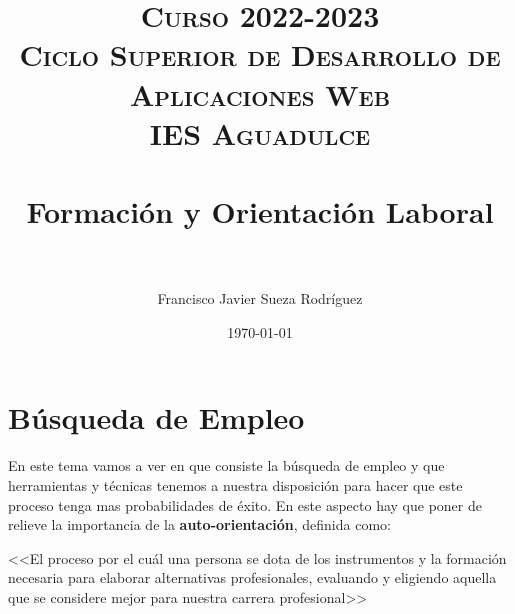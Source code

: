 


\title{
\normalfont \normalsize
\textsc{{\bfseries Curso 2022-2023} \\ Ciclo Superior de Desarrollo de Aplicaciones Web \\ IES Aguadulce} \\ [25pt]
\horrule{0.5pt} \\[0.4cm]
\huge Formación y Orientación Laboral \\
\horrule{0.5pt} \\[0.4cm]
}

\author{Francisco Javier Sueza Rodríguez}
\date{\normalsize\today}


\makeglossaries
{}



\maketitle

\newpage

\tableofcontents

\listoffigures


\newpage

\chapter{Búsqueda de Empleo}
En este tema vamos a ver en que consiste la búsqueda de empleo y que herramientas y técnicas tenemos a nuestra disposición para hacer que este proceso tenga mas probabilidades de éxito. En este aspecto hay que poner de relieve la importancia de la \textbf{auto-orientación}, definida como:

<<El proceso por el cuál una persona se dota de los instrumentos y la formación necesaria para elaborar alternativas profesionales, evaluando y eligiendo aquella que se considere mejor para nuestra carrera profesional>>\cite{apuntes01}

